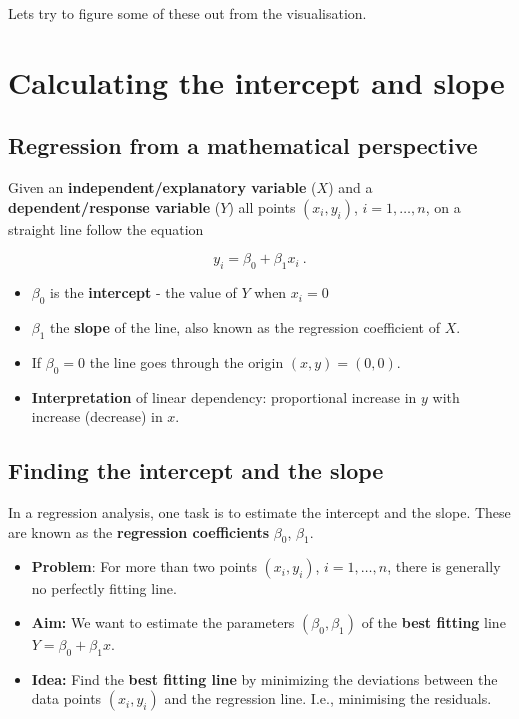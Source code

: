 \documentclass[
  letterpaper,
  8pt,
  a4paper]{book}
\providecommand{\tightlist}{%
  \setlength{\itemsep}{0pt}\setlength{\parskip}{0pt}}
\begin{document}
Lets try to figure some of these out from the visualisation.

\section*{Calculating the intercept and
slope}\label{calculating-the-intercept-and-slope}


\subsection*{Regression from a mathematical
perspective}\label{regression-from-a-mathematical-perspective}

Given an \textbf{independent/explanatory variable} (\(X\)) and a
\textbf{dependent/response variable} (\(Y\)) all points \((x_i,y_i)\),
\(i= 1,\ldots, n\), on a straight line follow the equation

\[y_i = \beta_0 + \beta_1 x_i\ .\]

\begin{itemize}
\tightlist
\item
  \(\beta_0\) is the \textbf{intercept} - the value of \(Y\) when
  \(x_i = 0\)
\item
  \(\beta_1\) the \textbf{slope} of the line, also known as the
  regression coefficient of \(X\).
\item
  If \(\beta_0=0\) the line goes through the origin \((x,y)=(0,0)\).
\item
  \textbf{Interpretation} of linear dependency: proportional increase in
  \(y\) with increase (decrease) in \(x\).
\end{itemize}

\subsection*{Finding the intercept and the
slope}\label{finding-the-intercept-and-the-slope}

In a regression analysis, one task is to estimate the intercept and the
slope. These are known as the \textbf{regression coefficients}
\(\beta_0\), \(\beta_1\).

\begin{itemize}
\item
  \textbf{Problem}: For more than two points \((x_i,y_i)\),
  \(i=1,\ldots, n\), there is generally no perfectly fitting line.
\item
  \textbf{Aim:} We want to estimate the parameters \((\beta_0,\beta_1)\)
  of the \textbf{best fitting} line \(Y = \beta_0 + \beta_1 x\).
\item
  \textbf{Idea:} Find the \textbf{best fitting line} by minimizing the
  deviations between the data points \((x_i,y_i)\) and the regression
  line. I.e., minimising the residuals.
\end{itemize}
\end{document}
